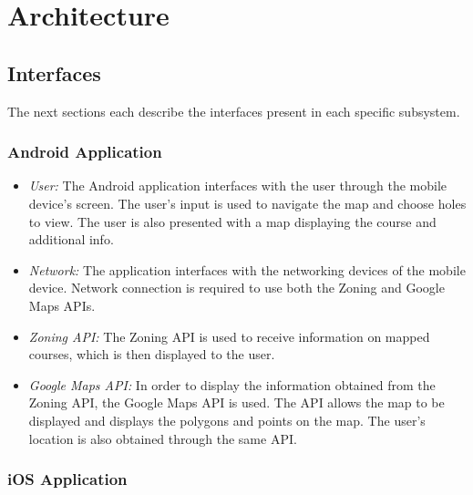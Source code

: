 \documentclass{article}
\begin{document}
    \newpage


    \section{Architecture}

    \subsection{Interfaces}

    The next sections each describe the interfaces present in each specific
    subsystem.

    \subsubsection{Android Application}

    \begin{itemize}
        \item \textit{User:} The Android application interfaces with the user
            through the mobile device's screen. The user's input is used to
            navigate the map and choose holes to view. The user is also
            presented with a map displaying the course and additional info.
        \item \textit{Network:} The application interfaces with the networking
            devices of the mobile device. Network connection is required to use
            both the Zoning and Google Maps APIs.
        \item \textit{Zoning API:} The Zoning API is used to receive
            information on mapped courses, which is then displayed to the user.
        \item \textit{Google Maps API:} In order to display the information
            obtained from the Zoning API, the Google Maps API is used. The API
            allows the map to be displayed and displays the polygons and points
            on the map. The user's location is also obtained through the same
            API.
    \end{itemize}

    \subsubsection{iOS Application}
\end{document}

